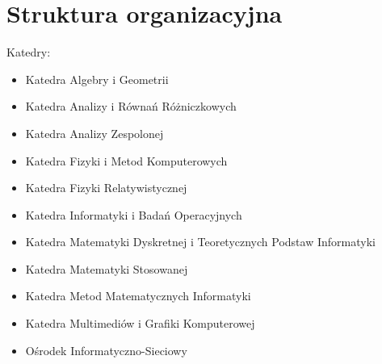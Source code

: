 \documentclass[a4paper,12pt]{article}\upshape
\begin{document}
\section{Struktura organizacyjna}
Katedry:
\begin{itemize}
\item Katedra Algebry i Geometrii
\item Katedra Analizy i Równań Różniczkowych
\item Katedra Analizy Zespolonej
\item Katedra Fizyki i Metod Komputerowych
\item Katedra Fizyki Relatywistycznej
\item Katedra Informatyki i Badań Operacyjnych
\item Katedra Matematyki Dyskretnej i Teoretycznych Podstaw Informatyki
\item Katedra Matematyki Stosowanej
\item Katedra Metod Matematycznych Informatyki
\item Katedra Multimediów i Grafiki Komputerowej
\end{itemize}
\begin{itemize}
Ośrodki:
\item Ośrodek Informatyczno-Sieciowy
\end{itemize}
\end{document}
